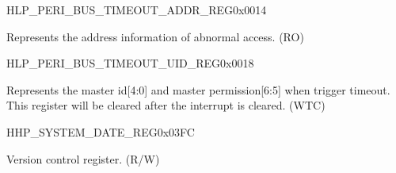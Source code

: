 \begin{register}{H}{LP\_PERI\_BUS\_TIMEOUT\_ADDR\_REG}{0x0014}\label{regdesc:LPPERIBUSTIMEOUTADDRREG}
%
\regnewline%
\begin{regdesc}\begin{reglist}
\label{fielddesc:LPPERIBUSTIMEOUTADDR}\item [LP\_PERI\_BUS\_TIMEOUT\_ADDR] Represents the address information of abnormal access. (RO)
\end{reglist}\end{regdesc}
\end{register}


\begin{register}{H}{LP\_PERI\_BUS\_TIMEOUT\_UID\_REG}{0x0018}\label{regdesc:LPPERIBUSTIMEOUTUIDREG}
%
%
\regnewline%
\begin{regdesc}\begin{reglist}
\label{fielddesc:LPPERIBUSTIMEOUTUID}\item [LP\_PERI\_BUS\_TIMEOUT\_UID] Represents the master id[4:0] and master permission[6:5] when trigger timeout. This register will be cleared after the interrupt is cleared. (WTC)
\end{reglist}\end{regdesc}
\end{register}




\begin{register}{H}{HP\_SYSTEM\_DATE\_REG}{0x03FC}\label{regdesc:HPSYSTEMDATEREG}
%
%
\regnewline%
\begin{regdesc}\begin{reglist}
\label{fielddesc:HPSYSTEMDATE}\item [HP\_SYSTEM\_DATE] Version control register. (R/W)
\end{reglist}\end{regdesc}
\end{register}


